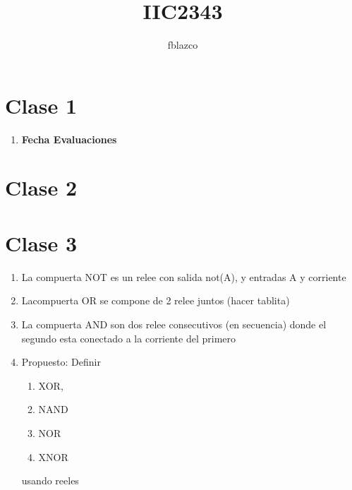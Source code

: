 \documentclass{article}
\author{fblazco}
\title{IIC2343}
\begin{document}
	\maketitle
    \section{Clase 1}
    \begin{enumerate}
        \item \textbf{Fecha Evaluaciones}
    \end{enumerate}    
    \section{Clase 2}
    \section{Clase 3}
    \begin{enumerate}
        \subsection{Compuertas}
        \item La compuerta NOT es un relee con salida not(A), y entradas A y corriente
        \item Lacompuerta OR se compone de 2 relee juntos (hacer tablita)
        \item La compuerta AND son dos relee consecutivos (en secuencia) donde el segundo esta conectado a la corriente del primero
        \item Propuesto: Definir \begin{enumerate}
            \item XOR, 
            \item   NAND 
            \item NOR 
            \item XNOR
        \end{enumerate}  usando reeles
    \end{enumerate}
\end{document}
